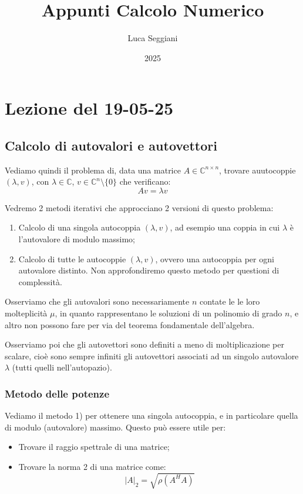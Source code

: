 \documentclass[a4paper,11pt]{article}
\title{Appunti Calcolo Numerico}
\author{Luca Seggiani}
\date{2025}
\begin{document}
\section{Lezione del 19-05-25}

\thispagestyle{empty}
\pagestyle{fancy}

\subsection{Calcolo di autovalori e autovettori}
Vediamo quindi il problema di, data una matrice $A \in \mathbb{C}^{n \times n}$, trovare auutocoppie $(\lambda, v)$, con $\lambda \in \mathbb{C}$, $v \in \mathbb{C}^n \setminus \{0\}$ che verificano:
$$
A v = \lambda v
$$

Vedremo 2 metodi iterativi che approcciano 2 versioni di questo problema:
\begin{enumerate}
	\item Calcolo di una singola autocoppia $(\lambda, v)$, ad esempio una coppia in cui $\lambda$ è l'autovalore di modulo massimo;
	\item Calcolo di tutte le autocoppie $(\lambda, v)$, ovvero una autocoppia per ogni autovalore distinto. Non approfondiremo questo metodo per questioni di complessità.
\end{enumerate}

Osserviamo che gli autovalori sono necessariamente $n$ contate le le loro molteplicità $\mu$, in quanto rappresentano le soluzioni di un polinomio di grado $n$, e altro non possono fare per via del teorema fondamentale dell'algebra.

Osserviamo poi che gli autovettori sono definiti a meno di moltiplicazione per scalare, cioè sono sempre infiniti gli autovettori associati ad un singolo autovalore $\lambda$ (tutti quelli nell'autopazio).

\subsubsection{Metodo delle potenze}
Vediamo il metodo 1) per ottenere una singola autocoppia, e in particolare quella di modulo (autovalore) massimo.
Questo può essere utile per:
\begin{itemize}
	\item Trovare il raggio spettrale di una matrice;
	\item Trovare la norma 2 di una matrice come:
		$$
			|A|_2 = \sqrt{\rho(A^H A)}
		$$
\end{itemize}
\end{document}
